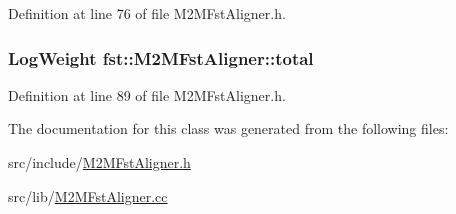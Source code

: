 Definition at line 76 of file M2\+M\+Fst\+Aligner.\+h.

\subsubsection[{total}]{\setlength{\rightskip}{0pt plus 5cm}Log\+Weight fst\+::\+M2\+M\+Fst\+Aligner\+::total}\hypertarget{classfst_1_1_m2_m_fst_aligner_abddceb68231f6724bf69f358f678c94d}{}\label{classfst_1_1_m2_m_fst_aligner_abddceb68231f6724bf69f358f678c94d}


Definition at line 89 of file M2\+M\+Fst\+Aligner.\+h.



The documentation for this class was generated from the following files\+:\begin{DoxyCompactItemize}
\item 
src/include/\hyperlink{_m2_m_fst_aligner_8h}{M2\+M\+Fst\+Aligner.\+h}\item 
src/lib/\hyperlink{_m2_m_fst_aligner_8cc}{M2\+M\+Fst\+Aligner.\+cc}\end{DoxyCompactItemize}
